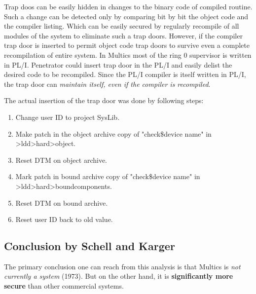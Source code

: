 Trap doos can be easily hidden in changes to the binary code of compiled routine. Such a change can be 
detected only by comparing bit by bit the object code and the compiler listing. Which can be easily secured 
by regularly recompile of all modules of the system to eliminate such a trap doors.
However, if the compiler trap door is inserted to permit object code trap doors to survive even a complete 
recompilation of entire system. 
In Multics most of the ring 0 supervisor is written in PL/I. Penetrator could insert trap door in the PL/I and 
easily delist the desired code to be recompiled.
Since the PL/I compiler is itself written in PL/I, the trap door can \textit{maintain itself, even if the 
compiler is recompiled}.

The actual insertion of the trap door was done by following steps:
\begin{enumerate}
    \item Change user ID to project SysLib.
    \item Make patch in the object archive copy of "check\$device\underline{} name" in >ldd>hard>object.
    \item Reset DTM on object archive.
    \item Mark patch in bound archive copy of "check\$device\underline{} name" in >ldd>hard>bound\underline{}components.
    \item Reset DTM on bound archive.
    \item Reset user ID back to old value.
\end{enumerate}


\subsection{Conclusion by Schell and Karger}

The primary conclusion one can reach from this analysis is that Multics is \textit{not currently a system} (1973).
But on the other hand, it is \textbf{significantly more secure} than other commercial systems.